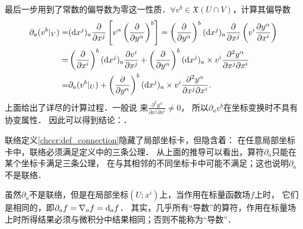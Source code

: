 最后一步用到了常数的偏导数为零这一性质．$\forall v^b \in \mathfrak{X}(U\cap V)$，计算其偏导数
    \begin{align*}
        \partial_a (v^b|_V ) =&    ({\rm d }x^j)_a\frac{\partial }{\partial x^j} \left[v^\alpha
        \left(\frac{\partial }{\partial y^\alpha}\right) ^b \right]
        = \left(\frac{\partial }{\partial y^\alpha}\right) ^b ({\rm d }x^j)_a
          \frac{\partial }{\partial x^j}\left(v^i \frac{\partial y^\alpha}{\partial x^i}\right) \\
        =& \left(\frac{\partial }{\partial x^i}\right) ^b ({\rm d }x^j)_a
        \frac{\partial v^i}{\partial x^j}
        +\left(\frac{\partial }{\partial y^\alpha}\right) ^b ({\rm d }x^j)_a
        \times v^i \frac{\partial^2 y^\alpha}{\partial x^j\partial x^i}   \\
        =& \partial_a (v^b|_U ) +\left(\frac{\partial }{\partial y^\alpha}\right) ^b ({\rm d }x^j)_a
        \times v^i \frac{\partial^2 y^\alpha}{\partial x^j\partial x^i}   .
    \end{align*}
上面给出了详尽的计算过程．一般说
来$\frac{\partial^2 y^\alpha}{\partial x^j\partial x^i}\neq 0$，
所以$\partial_a v^b$在坐标变换时不具有协变属性．
因此可以得到结论：．

联络定义\ref{chccr:def_connection}隐藏了局部坐标卡，但隐含着：
在任意局部坐标卡中，联络必须满足定义中的三条公理．
从上面的推导可以看出，算符$\partial_a$只能在某个坐标卡满足三条公理，
在与其相邻的不同坐标卡中可能不满足；这也说明$\partial_a$不是联络．


虽然$\partial_a$不是联络，但是在局部坐标$(U;x^i)$上，当作用在标量函数场$f$上时，
它们是相同的，即$\partial_a f = \nabla_a f = {\rm d}_a f$．
其实，几乎所有“导数”的算符，作用在标量场上时所得结果必须与微积分中结果相同；否则不能称为“导数”．

